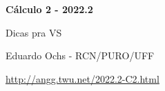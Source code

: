 \documentclass[oneside,12pt]{article}
\begin{document}


\def\u#1{\par{\footnotesize \url{#1}}}

\def\drafturl{http://angg.twu.net/LATEX/2022-2-C2.pdf}
\def\drafturl{http://angg.twu.net/2022.2-C2.html}
\def\draftfooter{\tiny \href{\drafturl}{\jobname{}} \ColorBrown{\shorttoday{} \hours}}



%

\thispagestyle{empty}

\begin{center}

\vspace*{1.2cm}

{\bf \Large Cálculo 2 - 2022.2}

\bsk

Dicas pra VS

\bsk

Eduardo Ochs - RCN/PURO/UFF

\url{http://angg.twu.net/2022.2-C2.html}

\end{center}

\newpage



\newpage

\end{document}
